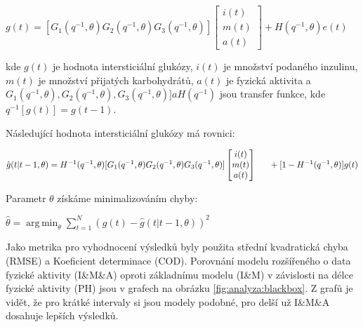 $g(t)=[G_{1}(q^{-1},\theta)G_{2}(q^{-1},\theta)G_{3}(q^{-1},\theta)]
\begin{bmatrix}
i(t)\\
m(t)\\
a(t)
\end{bmatrix}
+H(q^{-1},\theta)e(t)$

kde $g(t)$ je hodnota intersticiální glukózy, $i(t)$ je množství podaného inzulinu, $m(t)$ je množství přijatých karbohydrátů, $a(t)$ je fyzická aktivita a $G_{1}(q^{-1},\theta), G_{2}(q^{-1},\theta), G_{3}(q^{-1},\theta)] a H(q^{-1})$ jsou transfer funkce, kde $q^{-1}[g(t)]=g(t-1)$.

Následující hodnota intersticiální glukózy má rovnici:

$\hat{g}(t|t-1,\theta)=H^{-1}(q^{-1},\theta)[G_{1}(q^{-1},\theta)G_{2}(q^{-1},\theta)G_{3}(q^{-1},\theta)]
\begin{bmatrix}
i(t)\\
m(t)\\
a(t)
\end{bmatrix}\\
\indent +[1-H^{-1}(q^{-1},\theta)]g(t)$

Parametr $\theta$ získáme minimalizováním chyby:

$\hat{\theta} = \operatorname*{arg\,min}_\theta \displaystyle\sum^{N}_{t=1}(g(t)-\hat{g}(t|t-1,\theta))^{2}$

Jako metrika pro vyhodnocení výsledků byly použita střední kvadratická chyba (RMSE) a Koeficient determinace (COD). Porovnání modelu rozšířeného o data fyzické aktivity (I\&M\&A) oproti základnímu modelu (I\&M) v závislosti na délce fyzické aktivity (PH) jsou v grafech na obrázku \ref{fig:analyza:blackbox}. Z grafů je vidět, že pro krátké intervaly si jsou modely podobné, pro delší už I\&M\&A dosahuje lepších výsledků.

